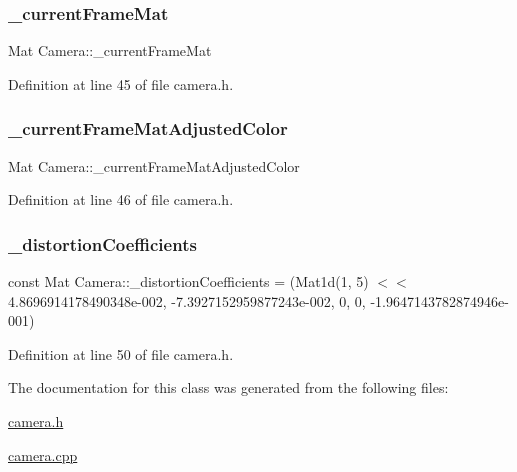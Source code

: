 \subsubsection{\texorpdfstring{\_currentFrameMat}{\_currentFrameMat}}
{\footnotesize\ttfamily Mat Camera\+::\+\_\+current\+Frame\+Mat\hspace{0.3cm}{\ttfamily [private]}}



Definition at line 45 of file camera.\+h.

\mbox{\label{class_camera_aeeeed5ac66a515e73cb315df765834ef}} 
\subsubsection{\texorpdfstring{\_currentFrameMatAdjustedColor}{\_currentFrameMatAdjustedColor}}
{\footnotesize\ttfamily Mat Camera\+::\+\_\+current\+Frame\+Mat\+Adjusted\+Color\hspace{0.3cm}{\ttfamily [private]}}



Definition at line 46 of file camera.\+h.

\mbox{\label{class_camera_a1e62bd10af4149eab0ca79e1c39a11ea}} 
\subsubsection{\texorpdfstring{\_distortionCoefficients}{\_distortionCoefficients}}
{\footnotesize\ttfamily const Mat Camera\+::\+\_\+distortion\+Coefficients = (Mat1d(1, 5) $<$$<$ 4.\+8696914178490348e-\/002, -\/7.\+3927152959877243e-\/002, 0, 0, -\/1.\+9647143782874946e-\/001)\hspace{0.3cm}{\ttfamily [private]}}



Definition at line 50 of file camera.\+h.



The documentation for this class was generated from the following files\+:\begin{DoxyCompactItemize}
\item 
\mbox{\hyperlink{camera_8h}{camera.\+h}}\item 
\mbox{\hyperlink{camera_8cpp}{camera.\+cpp}}\end{DoxyCompactItemize}
